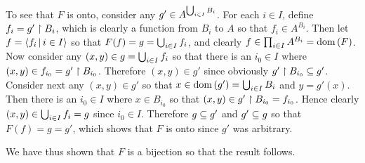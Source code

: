 {{    To see that $F$ is onto, consider any $g' \in A^{\uni B_i}$.
    For each $i \in I$, define $f_i = g' \rest B_i$, which is clearly a function from $B_i$ to $A$ so that $f_i \in A^{B_i}$.
    Then let $f = \angles{f_i \where i \in I}$ so that $F(f) = g = \uni f_i$, and clearly $f \in \prodi A^{B_i} = \dom(F)$.
    Now consider any $(x,y) \in g = \uni f_i$ so that there is an $i_0 \in I$ where $(x,y) \in f_{i_0} = g' \rest B_{i_0}$.
    Therefore $(x,y) \in g'$ since obviously $g' \rest B_{i_0} \ss g'$.
    Consider next any $(x,y) \in g'$ so that $x \in \dom(g') = \uni B_i$ and $y = g'(x)$.
    Then there is an $i_0 \in I$ where $x \in B_{i_0}$ so that $(x,y) \in g' \rest B_{i_0} = f_{i_0}$.
    Hence clearly $(x,y) \in \uni f_i = g$ since $i_0 \in I$.
    Therefore $g \ss g'$ and $g' \ss g$ so that $F(f) = g = g'$, which shows that $F$ is onto since $g'$ was arbitrary.

    We have thus shown that $F$ is a bijection so that the result follows.
  }
}
